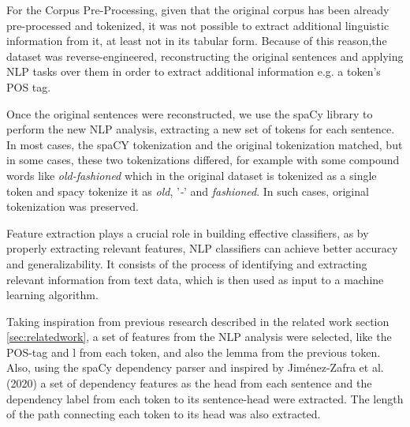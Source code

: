 For the Corpus Pre-Processing, given that the original corpus has been already pre-processed and tokenized, it was not possible to extract additional linguistic information from it, at least not in its tabular form. Because of this reason,the dataset was reverse-engineered, reconstructing the original sentences and applying NLP tasks over them in order to extract additional information e.g. a token's POS tag. 

Once the original sentences were reconstructed, we use the spaCy library to perform the new NLP analysis, extracting a new set of tokens for each sentence. In most cases, the spaCY tokenization and the original tokenization matched, but in some cases, these two tokenizations differed, for example with some compound words like \textit{old-fashioned} which in the original dataset is tokenized as a single token and spacy tokenize it as \textit{old}, '\textit{-}' and \textit{fashioned}. In such cases, original tokenization was preserved. 


Feature extraction plays a crucial role in building effective classifiers, as by properly extracting relevant features, NLP classifiers can achieve better accuracy and generalizability. It consists of the process of identifying and extracting relevant information from text data, which is then used as input to a machine learning algorithm.

Taking inspiration from previous research described in the related work section \ref{sec:relatedwork}, a set of features from the NLP analysis were selected, like the POS-tag and l from each token, and also the lemma from the previous token. Also, using the spaCy dependency parser and inspired by Jiménez-Zafra et al. (2020) \cite{jimenez2020detecting} a set of dependency features as the head from each sentence and the dependency label from each token to its sentence-head were extracted. The length of the path connecting each token to its head was also extracted. 

